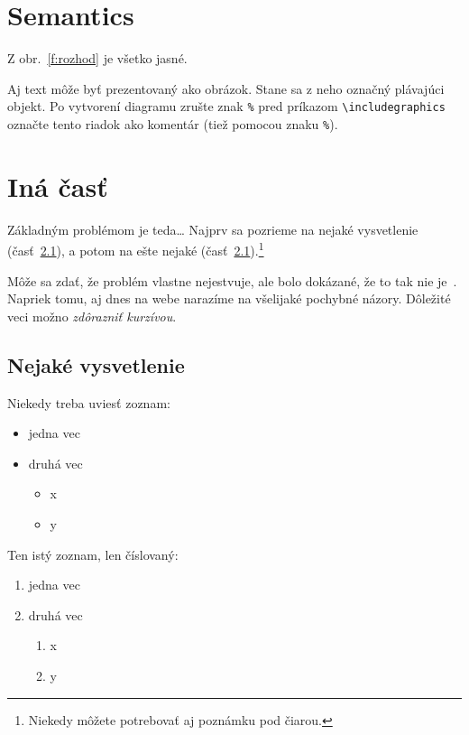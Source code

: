 \documentclass[10pt,twoside,english,a4paper]{article}
\begin{document}
\section{Semantics} \label{nejaka}

Z obr.~\ref{f:rozhod} je všetko jasné. 

\begin{figure*}[tbh]
\centering
Aj text môže byť prezentovaný ako obrázok. Stane sa z neho označný plávajúci objekt. Po vytvorení diagramu zrušte znak \texttt{\%} pred príkazom \verb|\includegraphics| označte tento riadok ako komentár (tiež pomocou znaku \texttt{\%}).
\caption{Rozhodujúci argument.}
\label{f:rozhod}
\end{figure*}



\section{Iná časť} \label{ina}

Základným problémom je teda\ldots{} Najprv sa pozrieme na nejaké vysvetlenie (časť~\ref{ina:nejake}), a potom na ešte nejaké (časť~\ref{ina:nejake}).\footnote{Niekedy môžete potrebovať aj poznámku pod čiarou.}


Môže sa zdať, že problém vlastne nejestvuje\cite{Coplien:MPD}, ale bolo dokázané, že to tak nie je~\cite{Czarnecki:Staged, Czarnecki:Progress}. Napriek tomu, aj dnes na webe narazíme na všelijaké pochybné názory\cite{PLP-Framework}. Dôležité veci možno \emph{zdôrazniť kurzívou}.


\subsection{Nejaké vysvetlenie} \label{ina:nejake}

Niekedy treba uviesť zoznam:

\begin{itemize}
\item jedna vec
\item druhá vec
	\begin{itemize}
	\item x
	\item y
	\end{itemize}
\end{itemize}

Ten istý zoznam, len číslovaný:

\begin{enumerate}
\item jedna vec
\item druhá vec
	\begin{enumerate}
	\item x
	\item y
	\end{enumerate}
\end{enumerate}
\end{document}
